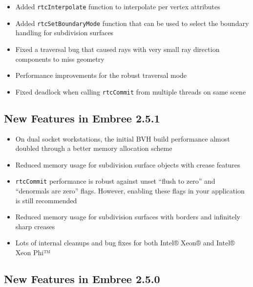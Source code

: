 \begin{itemize}
\tightlist
\item
  Added \texttt{rtcInterpolate} function to interpolate per vertex
  attributes
\item
  Added \texttt{rtcSetBoundaryMode} function that can be used to select
  the boundary handling for subdivision surfaces
\item
  Fixed a traversal bug that caused rays with very small ray direction
  components to miss geometry
\item
  Performance improvements for the robust traversal mode
\item
  Fixed deadlock when calling \texttt{rtcCommit} from multiple threads
  on same scene
\end{itemize}

\subsection{New Features in Embree
2.5.1}\label{new-features-in-embree-2.5.1}

\begin{itemize}
\tightlist
\item
  On dual socket workstations, the initial BVH build performance almost
  doubled through a better memory allocation scheme
\item
  Reduced memory usage for subdivision surface objects with crease
  features
\item
  \texttt{rtcCommit} performance is robust against unset ``flush to
  zero'' and ``denormals are zero'' flags. However, enabling these flags
  in your application is still recommended
\item
  Reduced memory usage for subdivision surfaces with borders and
  infinitely sharp creases
\item
  Lots of internal cleanups and bug fixes for both Intel® Xeon® and
  Intel® Xeon Phi™
\end{itemize}

\subsection{New Features in Embree
2.5.0}\label{new-features-in-embree-2.5.0}


